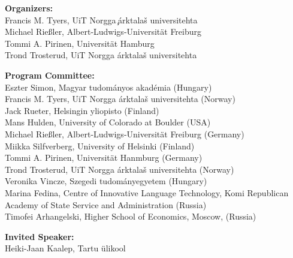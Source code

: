 \documentclass[11pt]{article}
\begin{document}

\vspace*{0.5cm}


\begin{description}
\item{\bf Organizers: }\vspace{2mm} \\
Francis M. Tyers, UiT Norgga ̧\'arktala\v{s} universitehta\\
Michael Rie\ss ler, Albert-Ludwigs-Universit\"at Freiburg\\
Tommi A. Pirinen, Universit\"at Hamburg\\
Trond Trosterud, UiT Norgga \'arktala\v{s} universitehta

\vspace{3mm}
\item{\bf Program Committee:}\vspace{2mm} \\
    Eszter Simon, Magyar tudom\'anyos akad\'emia (Hungary) \\
    Francis M. Tyers, UiT Norgga \'arktala\v{s} universitehta (Norway) \\
    Jack Rueter, Helsingin yliopisto (Finland) \\
    Mans Hulden, University of Colorado at Boulder (USA) \\
    Michael Rie\ss ler, Albert-Ludwigs-Universit\"at Freiburg (Germany) \\
    Miikka Silfverberg, University of Helsinki (Finland) \\
    Tommi A. Pirinen, Universit\"at Hanmburg (Germany) \\
    Trond Trosterud, UiT Norgga \'arktala\v{s} universitehta (Norway) \\
    Veronika Vincze, Szegedi tudom\'anyegyetem (Hungary) \\
    Marina Fedina, Centre of Innovative Language Technology, Komi Republican
    Academy of State Service and Administration (Russia) \\
    Timofei Arhangelski,  Higher School of Economics, Moscow, (Russia)

\vspace{3mm}
\item{\bf Invited Speaker:}\vspace{2mm} \\
    Heiki-Jaan Kaalep, Tartu \"ulikool



\end{description}
\end{document}
